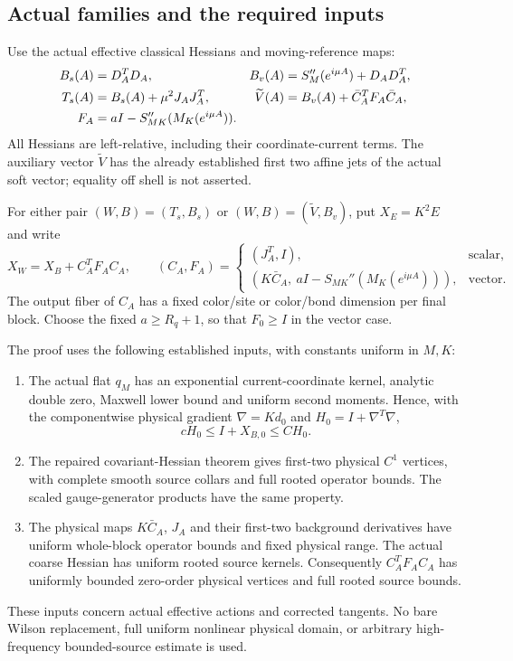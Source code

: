 \documentclass[11pt]{article}
\theoremstyle{remark}
\begin{document}
\subsection{Actual families and the required inputs}
\label{spb-inputs}

Use the actual effective classical Hessians and moving-reference maps:
\begin{align}
 B_s(A)&=D_A^TD_A,&
 B_v(A)&=S_M''(e^{i\mu A})+D_AD_A^T,\notag\\
 T_s(A)&=B_s(A)+\mu^2J_AJ_A^T,&
 \widetilde V(A)&=B_v(A)+\bar C_A^TF_A\bar C_A,\notag\\
 F_A&=aI-S_{MK}''(M_K(e^{i\mu A})).
 \label{spb-families}
\end{align}
All Hessians are left-relative, including their coordinate-current
terms. The auxiliary vector $\widetilde V$ has the already established
first two affine jets of the actual soft vector; equality off shell
is not asserted.

For either pair $(W,B)=(T_s,B_s)$ or
$(W,B)=(\widetilde V,B_v)$, put $X_E=K^2E$ and write
\begin{equation}
 X_W=X_B+C_A^TF_AC_A,
 \qquad
 (C_A,F_A)=
 \begin{cases}
 (J_A^T,I),&\text{scalar},\\
 (K\bar C_A,\ aI-S_{MK}''(M_K(e^{i\mu A}))),&\text{vector}.
 \end{cases}
 \label{spb-coarse-factor}
\end{equation}
The output fiber of $C_A$ has a fixed color/site or color/bond
dimension per final block. Choose the fixed $a\ge R_q+1$, so that
$F_0\ge I$ in the vector case.

The proof uses the following established inputs, with constants
uniform in $M,K$:

\begin{enumerate}
\item The actual flat $q_M$ has an exponential current-coordinate
kernel, analytic double zero, Maxwell lower bound and uniform second
moments. Hence, with the componentwise physical gradient
$\nabla=K d_0$ and $H_0=I+\nabla^T\nabla$,
\begin{equation}
 cH_0\le I+X_{B,0}\le CH_0.
 \label{spb-base-energy}
\end{equation}
\item The repaired covariant-Hessian theorem gives first-two physical
$C^1$ vertices, with complete smooth source collars and full rooted
operator bounds. The scaled gauge-generator products have the same
property.
\item The physical maps $K\bar C_A$, $J_A$ and their first-two
background derivatives have uniform whole-block operator bounds and
fixed physical range. The actual coarse Hessian has uniform rooted
source kernels. Consequently $C_A^TF_AC_A$ has uniformly bounded
zero-order physical vertices and full rooted source bounds.
\end{enumerate}
These inputs concern actual effective actions and corrected tangents.
No bare Wilson replacement, full uniform nonlinear physical domain,
or arbitrary high-frequency bounded-source estimate is used.
\end{document}

